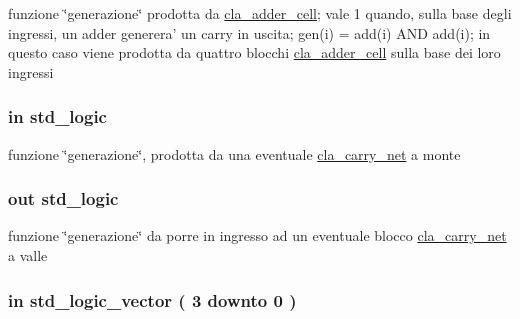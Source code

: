 funzione \char`\"{}generazione\char`\"{} prodotta da \hyperlink{classcla__adder__cell}{cla\+\_\+adder\+\_\+cell}; vale 1 quando, sulla base degli ingressi, un adder generera' un carry in uscita; gen(i) = add(i) A\+N\+D add(i); in questo caso viene prodotta da quattro blocchi \hyperlink{classcla__adder__cell}{cla\+\_\+adder\+\_\+cell} sulla base dei loro ingressi 

\hypertarget{group___carry_network_ga0a46d5193cb73eb993bc5d4f69741d0a}{
\subsubsection[{genin}]{ {\bfseries \textcolor{vhdlchar}{in}\textcolor{vhdlchar}{ }} {\bfseries \textcolor{vhdlchar}{std\+\_\+logic}\textcolor{vhdlchar}{ }} \hspace{0.3cm}{\ttfamily [Port]}}}\label{group___carry_network_ga0a46d5193cb73eb993bc5d4f69741d0a}


funzione \char`\"{}generazione\char`\"{}, prodotta da una eventuale \hyperlink{classcla__carry__net}{cla\+\_\+carry\+\_\+net} a monte 

\hypertarget{group___carry_network_ga068cd5c4d23e284cb942702252ed1491}{
\subsubsection[{genout}]{ {\bfseries \textcolor{vhdlchar}{out}\textcolor{vhdlchar}{ }} {\bfseries \textcolor{vhdlchar}{std\+\_\+logic}\textcolor{vhdlchar}{ }} \hspace{0.3cm}{\ttfamily [Port]}}}\label{group___carry_network_ga068cd5c4d23e284cb942702252ed1491}


funzione \char`\"{}generazione\char`\"{} da porre in ingresso ad un eventuale blocco \hyperlink{classcla__carry__net}{cla\+\_\+carry\+\_\+net} a valle 

\hypertarget{group___carry_network_gac1f84cd3374a5a4d2ee2669ebdadafe8}{
\subsubsection[{prop}]{ {\bfseries \textcolor{vhdlchar}{in}\textcolor{vhdlchar}{ }} {\bfseries \textcolor{vhdlchar}{std\+\_\+logic\+\_\+vector}\textcolor{vhdlchar}{ }\textcolor{vhdlchar}{(}\textcolor{vhdlchar}{ }\textcolor{vhdlchar}{ } \textcolor{vhdldigit}{3} \textcolor{vhdlchar}{ }\textcolor{vhdlchar}{downto}\textcolor{vhdlchar}{ }\textcolor{vhdlchar}{ } \textcolor{vhdldigit}{0} \textcolor{vhdlchar}{ }\textcolor{vhdlchar}{)}\textcolor{vhdlchar}{ }} \hspace{0.3cm}{\ttfamily [Port]}}}\label{group___carry_network_gac1f84cd3374a5a4d2ee2669ebdadafe8}


